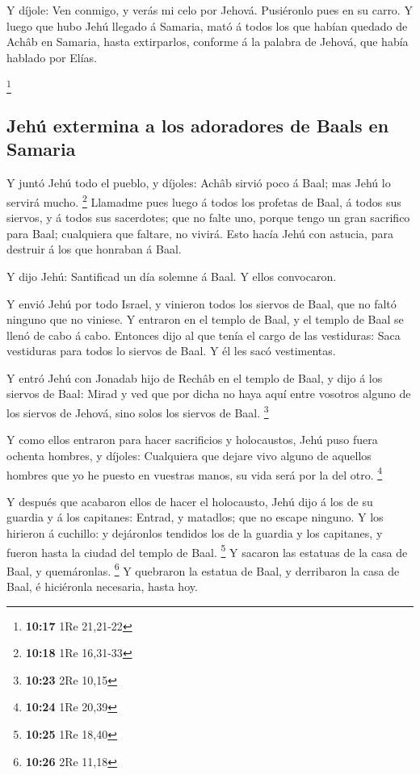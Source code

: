 Y díjole: Ven conmigo, y verás mi celo por Jehová.
Pusiéronlo pues en su carro.  Y luego que hubo Jehú llegado
á Samaria, mató á todos los que habían quedado de Achâb en Samaria,
hasta extirparlos, conforme á la palabra de Jehová, que había hablado
por Elías.

\footnote{\textbf{10:17} 1Re 21,21-22}

\hypertarget{jehuxfa-extermina-a-los-adoradores-de-baals-en-samaria}{%
\subsection{Jehú extermina a los adoradores de Baals en
Samaria}\label{jehuxfa-extermina-a-los-adoradores-de-baals-en-samaria}}

 Y juntó Jehú todo el pueblo, y díjoles: Achâb sirvió poco
á Baal; mas Jehú lo servirá mucho. \footnote{\textbf{10:18} 1Re 16,31-33}
 Llamadme pues luego á todos los profetas de Baal, á todos
sus siervos, y á todos sus sacerdotes; que no falte uno, porque tengo un
gran sacrifico para Baal; cualquiera que faltare, no vivirá. Esto hacía
Jehú con astucia, para destruir á los que honraban á Baal.

 Y dijo Jehú: Santificad un día solemne á Baal. Y ellos
convocaron.

 Y envió Jehú por todo Israel, y vinieron todos los siervos
de Baal, que no faltó ninguno que no viniese. Y entraron en el templo de
Baal, y el templo de Baal se llenó de cabo á cabo. 
Entonces dijo al que tenía el cargo de las vestiduras: Saca vestiduras
para todos lo siervos de Baal. Y él les sacó vestimentas.

 Y entró Jehú con Jonadab hijo de Rechâb en el templo de
Baal, y dijo á los siervos de Baal: Mirad y ved que por dicha no haya
aquí entre vosotros alguno de los siervos de Jehová, sino solos los
siervos de Baal. \footnote{\textbf{10:23} 2Re 10,15}

 Y como ellos entraron para hacer sacrificios y
holocaustos, Jehú puso fuera ochenta hombres, y díjoles: Cualquiera que
dejare vivo alguno de aquellos hombres que yo he puesto en vuestras
manos, su vida será por la del otro. \footnote{\textbf{10:24} 1Re 20,39}

 Y después que acabaron ellos de hacer el holocausto, Jehú
dijo á los de su guardia y á los capitanes: Entrad, y matadlos; que no
escape ninguno. Y los hirieron á cuchillo: y dejáronlos tendidos los de
la guardia y los capitanes, y fueron hasta la ciudad del templo de Baal.
\footnote{\textbf{10:25} 1Re 18,40}  Y sacaron las estatuas
de la casa de Baal, y quemáronlas. \footnote{\textbf{10:26} 2Re 11,18}
 Y quebraron la estatua de Baal, y derribaron la casa de
Baal, é hiciéronla necesaria, hasta hoy.

